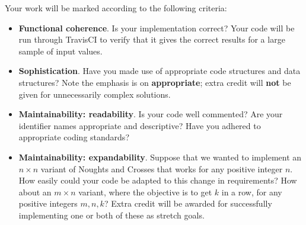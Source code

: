 \documentclass{../../../fal_assignment}
\begin{document}
Your work will be marked according to the following criteria:
\begin{itemize}
	\item \textbf{Functional coherence}. Is your implementation correct?
		Your code will be run through TravisCI to verify that it gives the correct results for a large sample of input values.
	\item \textbf{Sophistication}. Have you made use of appropriate code structures and data structures?
		Note the emphasis is on \textbf{appropriate}; extra credit will \textbf{not} be given for unnecessarily complex solutions.
	\item \textbf{Maintainability: readability}. Is your code well commented? Are your identifier names appropriate and descriptive?
		Have you adhered to appropriate coding standards?
	\item \textbf{Maintainability: expandability}. Suppose that we wanted to implement an $n \times n$ variant of Noughts and Crosses
		that works for any positive integer $n$.
		How easily could your code be adapted to this change in requirements?
		How about an $m \times n$ variant, where the objective is to get $k$ in a row,
		for any positive integers $m,n,k$?
		Extra credit will be awarded for successfully implementing one or both of these as stretch goals.
\end{itemize}
\end{document}
